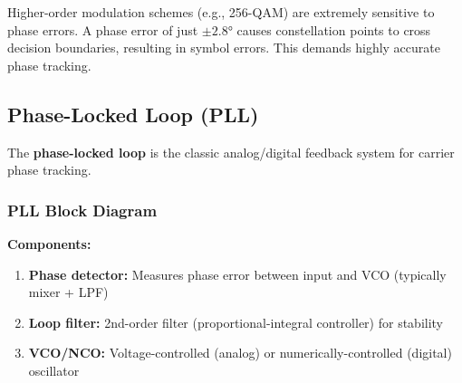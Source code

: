 \begin{warningbox}
Higher-order modulation schemes (e.g., 256-QAM) are extremely sensitive to phase errors. A phase error of just $\pm 2.8°$ causes constellation points to cross decision boundaries, resulting in symbol errors. This demands highly accurate phase tracking.
\end{warningbox}

\subsection{Phase-Locked Loop (PLL)}

The \textbf{phase-locked loop} is the classic analog/digital feedback system for carrier phase tracking.

\subsubsection{PLL Block Diagram}

\begin{center}
\end{center}

\textbf{Components:}
\begin{enumerate}
\item \textbf{Phase detector:} Measures phase error between input and VCO (typically mixer + LPF)
\item \textbf{Loop filter:} 2nd-order filter (proportional-integral controller) for stability
\item \textbf{VCO/NCO:} Voltage-controlled (analog) or numerically-controlled (digital) oscillator
\end{enumerate}

